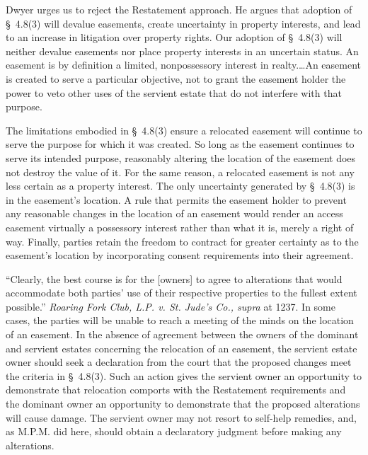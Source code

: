 Dwyer urges us to reject the Restatement approach. He argues that adoption of
\S~4.8(3) will devalue easements, create uncertainty in property interests, and
lead to an increase in litigation over property rights. Our adoption of
\S~4.8(3) will neither devalue easements nor place property interests in an
uncertain status. An easement is by definition a limited, nonpossessory interest
in realty.\ldots An easement is created to serve a particular objective, not to
grant the easement holder the power to veto other uses of the servient estate
that do not interfere with that purpose.

The limitations embodied in \S~4.8(3) ensure a relocated easement will continue
to serve the purpose for which it was created. So long as the easement continues
to serve its intended purpose, reasonably altering the location of the easement
does not destroy the value of it. For the same reason, a relocated easement is
not any less certain as a property interest. The only uncertainty generated by
\S~4.8(3) is in the easement's location. A rule that permits the easement holder
to prevent any reasonable changes in the location of an easement would render an
access easement virtually a possessory interest rather than what it is, merely a
right of way. Finally, parties retain the freedom to contract for greater
certainty as to the easement's location by incorporating consent requirements
into their agreement.

``Clearly, the best course is for the [owners] to agree to alterations that
would accommodate both parties' use of their respective properties to the
fullest extent possible.'' \textit{Roaring Fork Club, L.P. v. St. Jude's Co.,
supra} at 1237. In some cases, the parties will be unable to reach a meeting of
the minds on the location of an easement. In the absence of agreement between
the owners of the dominant and servient estates concerning the relocation of an
easement, the servient estate owner should seek a declaration from the court
that the proposed changes meet the criteria in \S~4.8(3). Such an action gives
the servient owner an opportunity to demonstrate that relocation comports with
the Restatement requirements and the dominant owner an opportunity to
demonstrate that the proposed alterations will cause damage. The servient owner
may not resort to self-help remedies, and, as M.P.M. did here, should obtain a
declaratory judgment before making any alterations.

